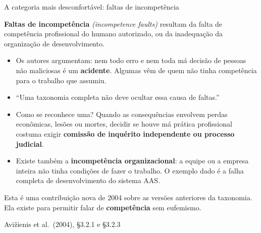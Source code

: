 \documentclass{beamer}
\newcommand{\en}[1]{{\color{depCinza}\textit{#1}}}
\newcommand{\sect}[1]{\par\smallskip\hfill{\tiny\color{black!55}Avi\v{z}ienis et al.\ (2004), #1}}
\begin{document}
\begin{frame}{A categoria mais desconfort\'avel: faltas de incompet\^encia}
    \footnotesize
    \begin{defi}
        \scriptsize
        \textbf{Faltas de incompet\^encia} \en{(incompetence faults)} resultam da falta de compet\^encia profissional do humano autorizado, ou da inadequa\c{c}\~ao da organiza\c{c}\~ao de desenvolvimento.
    \end{defi}
    \medskip
    \begin{itemize}
        \item Os autores argumentam: nem todo erro e nem toda m\'a decis\~ao de pessoas n\~ao maliciosas \'e um \textbf{acidente}. Algumas v\^em de quem n\~ao tinha compet\^encia para o trabalho que assumiu.
        \item ``Uma taxonomia completa n\~ao deve ocultar essa causa de faltas.''
        \item Como se reconhece uma? Quando as consequ\^encias envolvem perdas econ\^omicas, les\~oes ou mortes, decidir se houve m\'a pr\'atica profissional costuma exigir \textbf{comiss\~ao de inqu\'erito independente ou processo judicial}.
        \item Existe tamb\'em a \textbf{incompet\^encia organizacional}: a equipe ou a empresa inteira n\~ao tinha condi\c{c}\~oes de fazer o trabalho. O exemplo dado \'e a falha completa de desenvolvimento do sistema AAS.
    \end{itemize}
    \medskip
    \begin{ancora}
        \footnotesize
        Esta \'e uma contribui\c{c}\~ao nova de 2004 sobre as vers\~oes anteriores da taxonomia. Ela existe para permitir falar de \textbf{compet\^encia} sem eufemismo.
    \end{ancora}
    \sect{\S3.2.1 e \S3.2.3}
\end{frame}
\end{document}
